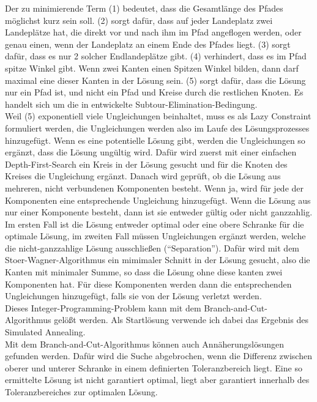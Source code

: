 \documentclass[a4paper,10pt,ngerman]{scrartcl}
\begin{document}
Der zu minimierende Term (1) bedeutet, dass die Gesamtlänge des Pfades möglichst kurz sein soll. (2) sorgt dafür, dass auf jeder Landeplatz
zwei Landeplätze hat, die direkt vor und nach ihm im Pfad angeflogen werden, oder genau einen, wenn der Landeplatz an einem Ende des Pfades liegt.
(3) sorgt dafür, dass es nur 2 solcher Endlandeplätze gibt. (4) verhindert, dass es im Pfad spitze Winkel gibt. Wenn zwei Kanten einen Spitzen
Winkel bilden, dann darf maximal eine dieser Kanten in der Lösung sein. (5) sorgt dafür, dass die Lösung nur ein Pfad ist, und nicht ein Pfad und
Kreise durch die restlichen Knoten. Es handelt sich um die in \cite{dantzig_1954} entwickelte Subtour-Elimination-Bedingung.\\
Weil (5) exponentiell viele Ungleichungen beinhaltet, muss es als Lazy Constraint formuliert werden, die Ungleichungen werden also im Laufe des Lösungsprozesses
hinzugefügt. Wenn es
eine potentielle Lösung gibt, werden die Ungleichungen so ergänzt, dass die Lösung ungültig wird. Dafür wird zuerst mit einer einfachen Depth-First-Search ein Kreis
in der Lösung gesucht und für die Knoten des Kreises die Ungleichung ergänzt. Danach wird geprüft, ob die Lösung aus mehreren, nicht verbundenen Komponenten besteht. Wenn ja, wird für
jede der Komponenten eine entsprechende Ungleichung hinzugefügt. Wenn die Lösung aus nur einer Komponente besteht, dann ist sie entweder gültig oder nicht ganzzahlig. Im ersten Fall
ist die Lösung entweder optimal oder eine obere Schranke für die optimale Lösung, im zweiten Fall müssen Ungleichungen ergänzt werden, welche die nicht-ganzzahlige Lösung
ausschließen (``Separation''). Dafür wird mit dem Stoer-Wagner-Algorithmus\cite{stoer_1997} ein mimimaler Schnitt in der Lösung gesucht,
also die Kanten mit minimaler Summe, so dass die Lösung ohne
diese kanten zwei Komponenten hat. Für diese Komponenten werden dann die entsprechenden Ungleichungen hinzugefügt, falls sie von der Lösung verletzt werden. \\
Dieses Integer-Programming-Problem kann mit dem Branch-and-Cut-Algorithmus\cite{padberg_1991} gelößt werden. Als Startlösung verwende ich dabei das Ergebnis des Simulated Annealing. \\
Mit dem Branch-and-Cut-Algorithmus können auch Annäherungslösungen gefunden werden. Dafür wird die Suche abgebrochen, wenn die Differenz zwischen oberer und unterer Schranke
in einem definierten Toleranzbereich liegt. Eine so ermittelte Lösung ist nicht garantiert optimal, liegt aber garantiert innerhalb des Toleranzbereiches zur optimalen Lösung.
\end{document}
